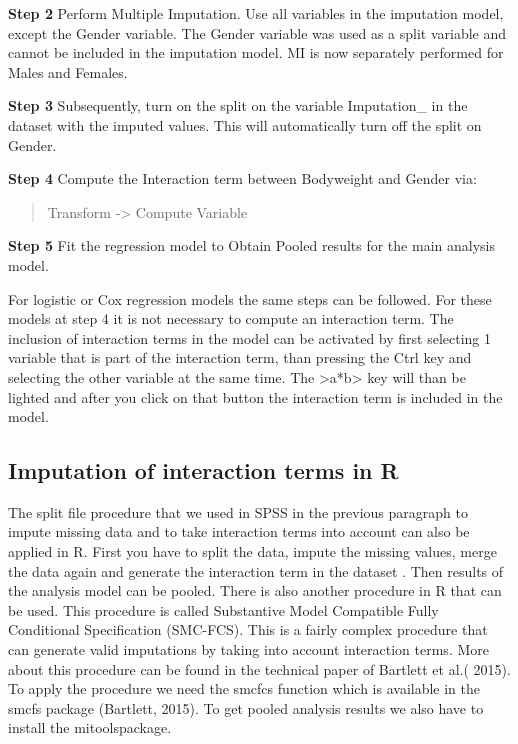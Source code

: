 \documentclass[]{book}
\begin{document}
\textbf{Step 2} Perform Multiple Imputation. Use all variables in the
imputation model, except the Gender variable. The Gender variable was
used as a split variable and cannot be included in the imputation model.
MI is now separately performed for Males and Females.

\textbf{Step 3} Subsequently, turn on the split on the variable
Imputation\_ in the dataset with the imputed values. This will
automatically turn off the split on Gender.

\textbf{Step 4} Compute the Interaction term between Bodyweight and
Gender via:

\begin{quote}
Transform -\textgreater{} Compute Variable
\end{quote}

\textbf{Step 5} Fit the regression model to Obtain Pooled results for
the main analysis model.

For logistic or Cox regression models the same steps can be followed.
For these models at step 4 it is not necessary to compute an interaction
term. The inclusion of interaction terms in the model can be activated
by first selecting 1 variable that is part of the interaction term, than
pressing the Ctrl key and selecting the other variable at the same time.
The \textgreater{}a*b\textgreater{} key will than be lighted and after
you click on that button the interaction term is included in the model.

\subsection{Imputation of interaction terms in
R}\label{imputation-of-interaction-terms-in-r}

The split file procedure that we used in SPSS in the previous paragraph
to impute missing data and to take interaction terms into account can
also be applied in R. First you have to split the data, impute the
missing values, merge the data again and generate the interaction term
in the dataset . Then results of the analysis model can be pooled. There
is also another procedure in R that can be used. This procedure is
called Substantive Model Compatible Fully Conditional Specification
(SMC-FCS). This is a fairly complex procedure that can generate valid
imputations by taking into account interaction terms. More about this
procedure can be found in the technical paper of Bartlett et al.( 2015).
To apply the procedure we need the smcfcs function which is available in
the smcfs package (Bartlett, 2015). To get pooled analysis results we
also have to install the mitoolspackage.
\end{document}
